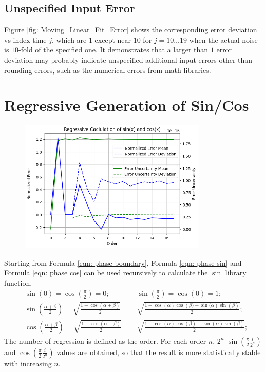 \documentclass[twoside]{article}
\numberwithin{equation}{section}
\begin{document}
\subsection{Unspecified Input Error}

Figure \ref{fig: Moving_Linear_Fit_Error} shows the corresponding error deviation vs index time $j$, which are $1$ except near $10$ for $j = 10 \dots 19$ when the actual noise is $10$-fold of the specified one.
It demonstrates that a larger than $1$ error deviation may probably indicate unspecified additional input errors other than rounding errors, such as the numerical errors from math libraries.




  


\clearpage
\section{Regressive Generation of Sin/Cos}
\label{sec: recursion}

\begin{figure}
\centering
\includegraphics[height=2.5in]{Uncertain_Sin.png}
\label{fig: Uncertain_Sin}
\end{figure}

Starting from Formula \eqref{eqn: phase boundary}, Formula \eqref{eqn: phase sin} and Formula \eqref{eqn: phase cos} can be used recursively to calculate the $\sin$ library function.  
\begin{align}
\label{eqn: phase boundary}
& \sin(0) = \cos(\frac{\pi}{2}) = 0; & \sin(\frac{\pi}{2}) = \cos(0) = 1; \\
\label{eqn: phase sin}
& \sin \left(\frac{\alpha + \beta}{2} \right) = \sqrt{\frac{1 - \cos \left(\alpha + \beta \right)}{2}} = & \sqrt{\frac{1 - \cos(\alpha) \cos \left(\beta) + \sin(\alpha \right) \sin(\beta)}{2}}; \\
\label{eqn: phase cos}
& \cos \left(\frac{\alpha + \beta}{2} \right) = \sqrt{\frac{1 + \cos \left(\alpha + \beta \right)}{2}} = & \sqrt{\frac{1 + \cos(\alpha) \cos(\beta) - \sin(\alpha) \sin(\beta)}{2}};
\end{align}
The number of regression is defined as the order.
For each order $n$, $2^n$ $\sin(\frac{\pi}{2} \frac{i}{2^n})$ and $\cos(\frac{\pi}{2} \frac{i}{2^n})$ values are obtained, so that the result is more statistically stable with increasing $n$.
\end{document}
